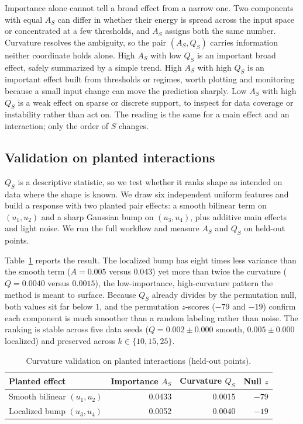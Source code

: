 \documentclass[11pt]{article}
\begin{document}
Importance alone cannot tell a broad effect from a narrow one. Two components
with equal $A_S$ can differ in whether their energy is spread across the input
space or concentrated at a few thresholds, and $A_S$ assigns both the same
number. Curvature resolves the ambiguity, so the pair $(A_S,Q_S)$ carries
information neither coordinate holds alone. High $A_S$ with low $Q_S$ is an
important broad effect, safely summarized by a simple trend. High $A_S$ with high
$Q_S$ is an important effect built from thresholds or regimes, worth plotting and
monitoring because a small input change can move the prediction sharply. Low
$A_S$ with high $Q_S$ is a weak effect on sparse or discrete support, to inspect
for data coverage or instability rather than act on. The reading is the same for
a main effect and an interaction; only the order of $S$ changes.

\subsection{Validation on planted interactions}
\label{sec:validation}

$Q_S$ is a descriptive statistic, so we test whether it ranks shape as intended
on data where the shape is known. We draw six independent uniform features and
build a response with two planted pair effects: a smooth bilinear term on
$(u_1,u_2)$ and a sharp Gaussian bump on $(u_3,u_4)$, plus additive main effects
and light noise. We run the full workflow and measure $A_S$ and $Q_S$ on held-out
points.

Table~\ref{tab:validation} reports the result. The localized bump has eight times
less variance than the smooth term ($A=0.005$ versus $0.043$) yet more than twice
the curvature ($Q=0.0040$ versus $0.0015$), the low-importance, high-curvature
pattern the method is meant to surface. Because $Q_S$ already divides by the
permutation null, both values sit far below $1$, and the permutation $z$-scores
($-79$ and $-19$) confirm each component is much smoother than a random labeling
rather than noise. The ranking is stable across five data seeds
($Q=0.002\pm0.000$ smooth, $0.005\pm0.000$ localized) and preserved across
$k\in\{10,15,25\}$.

\begin{table}[ht]
\centering
\caption{Curvature validation on planted interactions (held-out points).}
\label{tab:validation}
\begin{tabular}{lrrr}
\toprule
Planted effect & Importance $A_S$ & Curvature $Q_S$ & Null $z$\\
\midrule
Smooth bilinear $(u_1,u_2)$ & 0.0433 & 0.0015 & $-79$\\
Localized bump $(u_3,u_4)$  & 0.0052 & 0.0040 & $-19$\\
\bottomrule
\end{tabular}
\end{table}
\end{document}
